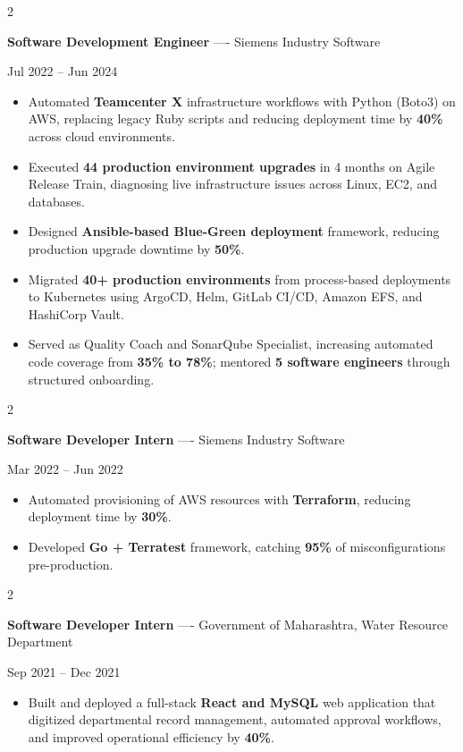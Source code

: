 \documentclass[10pt, letterpaper]{article}
\newenvironment{highlights}{
    \begin{itemize}[
        topsep=0.10 cm,
        parsep=0.06 cm,
        partopsep=0pt,
        itemsep=0.06 cm,
        leftmargin=12pt
    ]
}{
    \end{itemize}
}
\newenvironment{twocolentry}[2][]{
    \onecolentry
    \def\secondColumn{#2}
    \setcolumnwidth{\fill, 4.5 cm}
    \begin{paracol}{2}
}{
    \switchcolumn \raggedleft \secondColumn
    \end{paracol}
    \endonecolentry
}
\begin{document}
\vspace{0.15 cm}

\begin{twocolentry}{Jul 2022 -- Jun 2024}
\textbf{Software Development Engineer} ---- Siemens Industry Software
\end{twocolentry}
\begin{highlights}
  \item Automated \textbf{Teamcenter X} infrastructure workflows with Python (Boto3) on AWS, replacing legacy Ruby scripts and reducing deployment time by \textbf{40\%} across cloud environments.
  \item Executed \textbf{44 production environment upgrades} in 4 months on Agile Release Train, diagnosing live infrastructure issues across Linux, EC2, and databases.
  \item Designed \textbf{Ansible-based Blue-Green deployment} framework, reducing production upgrade downtime by \textbf{50\%}.
  \item Migrated \textbf{40+ production environments} from process-based deployments to Kubernetes using ArgoCD, Helm, GitLab CI/CD, Amazon EFS, and HashiCorp Vault.
  \item Served as Quality Coach and SonarQube Specialist, increasing automated code coverage from \textbf{35\% to 78\%}; mentored \textbf{5 software engineers} through structured onboarding.
\end{highlights}

\vspace{0.15 cm}

\begin{twocolentry}{Mar 2022 -- Jun 2022}
\textbf{Software Developer Intern} ---- Siemens Industry Software
\end{twocolentry}
\begin{highlights}
  \item Automated provisioning of AWS resources with \textbf{Terraform}, reducing deployment time by \textbf{30\%}.
  \item Developed \textbf{Go + Terratest} framework, catching \textbf{95\%} of misconfigurations pre-production.
\end{highlights}

\vspace{0.15 cm}

\begin{twocolentry}{Sep 2021 -- Dec 2021}
\textbf{Software Developer Intern} ---- Government of Maharashtra, Water Resource Department
\end{twocolentry}
\begin{highlights}
  \item Built and deployed a full-stack \textbf{React and MySQL} web application that digitized departmental record management, automated approval workflows, and improved operational efficiency by \textbf{40\%}.
\end{highlights}
\end{document}
